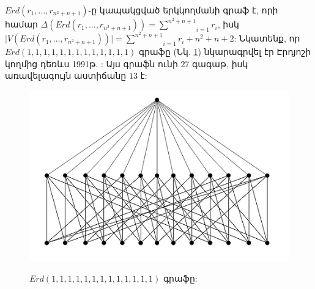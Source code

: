 $Erd(r_{1},\ldots,r_{n^{2}+n+1})$-ը կապակցված երկկողմանի գրաֆ է, որի համար $\Delta
(Erd(r_{1},\ldots,r_{n^{2}+n+1}))=\underset{i=1}{\overset{n^{2}+n+1}{\sum
}}r_{i}$, իսկ $\vert
V(Erd(r_{1},\ldots,r_{n^{2}+n+1}))\vert=\underset{i=1}{\overset{n^{2}+n+1}{\sum
}}r_{i}+n^{2}+n+2$: Նկատենք, որ
$Erd(1,1,1,1,1,1,1,1,1,1,1,1,1)$ գրաֆը (Նկ. \ref{f3_Erd}) նկարագրվել էր Էրդյոշի կողմից դեռևս 1991թ.
\cite{JensenToft1995}: Այս գրաֆն ունի $27$ գագաթ, իսկ առավելագույն աստիճանը $13$ է:

\begin{figure}[t]
\begin{center}
\includegraphics[width=30pc]{figures/erd13.jpg}\\
\caption{$Erd(1,1,1,1,1,1,1,1,1,1,1,1,1)$ գրաֆը:}\label{f3_Erd}
\end{center}
\end{figure}


